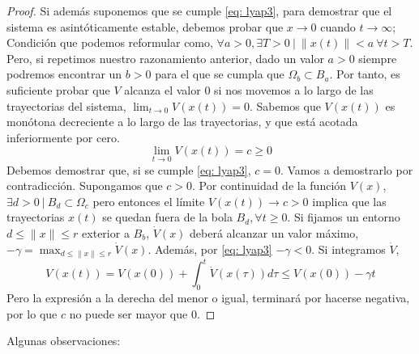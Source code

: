 \begin{proof}
Si además suponemos que se cumple \ref{eq: lyap3}, para demostrar que el sistema es asintóticamente estable, debemos probar que $x \to 0$ cuando $t \to \infty$; Condición que podemos reformular como, $\forall a >0, \exists T>0\ | \ \|x(t)\| < a \ \forall t>T$. Pero, si repetimos nuestro razonamiento anterior, dado un valor $a>0$ siempre podremos encontrar un $b>0$ para el que se cumpla que $ \Omega_b \subset B_a$. Por tanto, es suficiente probar que $V$ alcanza el valor $0$ si nos movemos a lo largo de las trayectorias del sistema, $\lim_{t \to 0}V(x(t))=0$. Sabemos que $V(x(t))$ es monótona decreciente a lo largo de las trayectorias, y que está acotada inferiormente por cero.
\begin{equation}
\lim_{t \to 0}V(x(t))=c \geq 0
\end{equation}
Debemos demostrar que,  si se cumple \ref{eq: lyap3}, $c=0$. Vamos a demostrarlo por contradicción. Supongamos que $c>0$. Por continuidad de la función $V(x)$, $\exists d>0\ | \ B_d \subset \Omega_c$ pero entonces el límite $V(x(t))\to c>0$ implica que las trayectorias $x(t)$ se quedan fuera de la bola $B_d, \forall t \geq 0$. Si fijamos  un entorno $d \leq \|x\| \leq r$ exterior a $B_b$, $\dot V(x)$ deberá alcanzar un valor máximo, $-\gamma =\max_{d \leq \| x \| \leq r} \dot{V}(x)$. Además, por \ref{eq: lyap3} $-\gamma < 0$. Si integramos $\dot V$,
\begin{equation*}
V(x(t)) = V(x(0)) + \int_0^t \dot V(x(\tau))d\tau \leq V(x(0)) -\gamma t
\end{equation*}
Pero la expresión a la derecha del menor o igual, terminará por hacerse negativa, por lo que $c$ no puede ser mayor que 0.
\end{proof}
Algunas observaciones:
